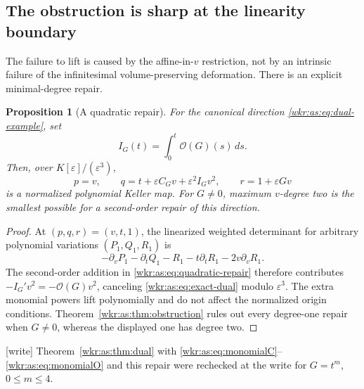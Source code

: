 \documentclass[11pt,a4paper]{article}
\numberwithin{equation}{section}
\newtheorem{proposition}[theorem]{Proposition}
\theoremstyle{definition}
\theoremstyle{remark}
\newcommand{\eps}{\varepsilon}
\begin{document}
\subsection{The obstruction is sharp at the linearity boundary}

The failure to lift is caused by the affine-in-$v$ restriction, not by an
intrinsic failure of the infinitesimal volume-preserving deformation.
There is an explicit minimal-degree repair.

\begin{proposition}[A quadratic repair]\label{wkr:as:prop:quadratic-repair}
For the canonical direction \eqref{wkr:as:eq:dual-example}, set
\[
I_G(t)=\int_0^t\mathcal O(G)(s)\,ds.
\]
Then, over $K[\eps]/(\eps^3)$,
\begin{equation}\label{wkr:as:eq:quadratic-repair}
p=v,\qquad q=t+\eps C_Gv+\eps^2 I_Gv^2,\qquad
r=1+\eps Gv
\end{equation}
is a normalized polynomial Keller map. For $G\ne0$, maximum $v$-degree
two is the smallest possible for a second-order repair of this direction.
\end{proposition}
\begin{proof}
At $(p,q,r)=(v,t,1)$, the linearized weighted determinant for arbitrary
polynomial variations $(P_1,Q_1,R_1)$ is
\begin{equation}\label{wkr:as:eq:unrestricted-linearization}
-\partial_vP_1-\partial_tQ_1-R_1-t\partial_tR_1-2v\partial_vR_1.
\end{equation}
The second-order addition in \eqref{wkr:as:eq:quadratic-repair} therefore
contributes $-I_G'v^2=-\mathcal O(G)v^2$, canceling
\eqref{wkr:as:eq:exact-dual} modulo $\eps^3$. The extra monomial powers
lift polynomially and do not affect the normalized origin conditions.
Theorem~\ref{wkr:as:thm:obstruction} rules out every degree-one repair
when $G\ne0$, whereas the displayed one has degree two.
\end{proof}
\noindent\textup{[write]} Theorem~\ref{wkr:as:thm:dual} with
\eqref{wkr:as:eq:monomialC}--\eqref{wkr:as:eq:monomialO} and this
repair were rechecked at the write for $G=t^m$, $0\le m\le4$.
\end{document}
